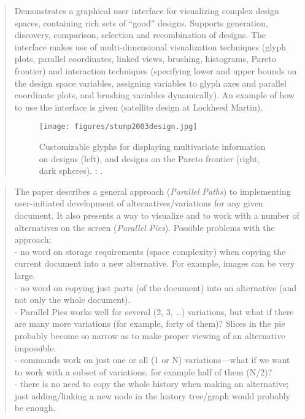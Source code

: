 		\begin{quote}
		\small
		Demonstrates a graphical user interface for visualizing complex design spaces,
		containing rich sets of ``good'' designs. Supports generation, discovery,
		comparison, selection and recombination of designs. The interface makes use of multi-dimensional
		visualization techniques (glyph plots, parallel coordinates, linked views,
		brushing, histograms, Pareto frontier) and interaction techniques (specifying lower and upper
		bounds on the design space variables, assigning variables to glyph axes and parallel
		coordinate plots, and brushing variables dynamically). An example of how to
		use the interface is given (satellite design at Lockheed Martin).
		\begin{figure}[htb]
			\begin{center}
			\texttt{[image: figures/stump2003design.jpg]}
			\caption{Customizable glyphs for displaying multivariate information on designs (left), 
			and designs on the Pareto frontier (right, dark spheres). 
			\citeauthor{stump2003design}: 
			\cite{stump2003design}.}
			\label{fig:stump2003design}
			\end{center}
		\end{figure}
		\end{quote}


		\begin{quote}
		\small
		The paper describes a general approach ({\em Parallel Paths}) 
		to implementing user-initiated development of alternatives/variations for any given document.
		It also presents a way to visualize and to work with a number of alternatives on the screen
		({\em Parallel Pies}).
		Possible problems with the approach:\\
		- no word on storage requirements (space complexity) when copying the current document
		  into a new alternative. For example, images can be very large.\\
		- no word on copying just parts (of the document) into an alternative (and not only the whole
		  document).\\
		- Parallel Pies works well for several (2, 3, \dots) variations, but what if there are many more
		  variations (for example, forty of them)? Slices in the pie probably become so 
		  narrow as to make proper viewing of an alternative impossible.\\
		- commands work on just one or all (1 or N) variations---what if we want to work with a subset
		  of variations, for example half of them (N/2)?\\
		- there is no need to copy the whole history when making an alternative; just adding/linking a new 
		  node in the history tree/graph would probably be enough.
		\end{quote}

